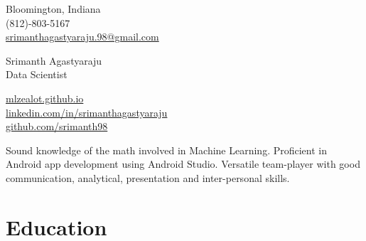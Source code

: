 \documentclass[a4,10pt]{article}
\begin{document}
\begin{center}
    \begin{minipage}[b]{0.24\textwidth}
            \small Bloomington, Indiana \\
            \small (812)-803-5167 \\
            \small \href{mailto:srimanthagastyaraju.98@gmail.com}{srimanthagastyaraju.98@gmail.com}
    \end{minipage}%
    \begin{minipage}[b]{0.5\textwidth}
            \centering
            {\HUGE Srimanth Agastyaraju} \\ %
            \vspace{0.1cm}
            {\color{UI_blue} \Large{Data Scientist}} \\
    \end{minipage}%
    \begin{minipage}[b]{0.24\textwidth}
            \flushright \small  %
            {\href{https://mlzealot.github.io/}{mlzealot.github.io}} \\
            {\href{https://www.linkedin.com/in/srimanthagastyaraju/}{linkedin.com/in/srimanthagastyaraju}} \\
            \href{https://github.com/srimanth98}{github.com/srimanth98}
    \end{minipage}   
    
\vspace{-0.15cm} 
{\color{UI_blue} \hrulefill}
\end{center}
\vspace{-0.2cm}
Sound knowledge of the math involved in Machine Learning. 
Proficient in Android app development using Android Studio. 
Versatile team-player with good communication, analytical, presentation and inter-personal skills. 

\vspace{-0.2cm}



\section{Education }
\end{document}
